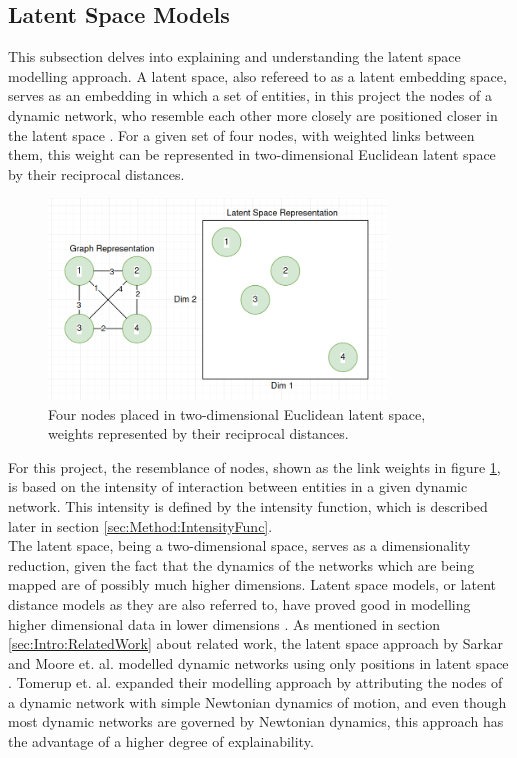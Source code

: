 \subsection{Latent Space Models}
\label{sec:Method:LSM}
This subsection delves into explaining and understanding the latent space modelling approach. A latent space, also refereed to as a latent embedding space, serves as an embedding in which a set of entities, in this project the nodes of a dynamic network, who resemble each other more closely are positioned closer in the latent space \cite{Sarkar2005DynamicModels} \cite{Kim2017AVariables}.
For a given set of four nodes, with weighted links between them, this weight can be represented in two-dimensional Euclidean latent space by their reciprocal distances.  

\begin{figure}[H]
    \centering
    \includegraphics[width=0.8\textwidth]{0_images/latentspace.png}
    \caption{Four nodes placed in two-dimensional Euclidean latent space, weights represented by their reciprocal distances.}
    \label{fig:latentspace}
\end{figure}
\noindent
For this project, the resemblance of nodes, shown as the link weights in figure \ref{fig:latentspace}, is based on the intensity of interaction between entities in a given dynamic network.
This intensity is defined by the intensity function, which is described later in section \ref{sec:Method:IntensityFunc}.
\\
The latent space, being a two-dimensional space, serves as a dimensionality reduction, given the fact that the dynamics of the networks which are being mapped are of possibly much higher dimensions.
Latent space models, or latent distance models as they are also referred to, have proved good in modelling higher dimensional data in lower dimensions \cite{Gourieroux2021ScalableNetworks}.
As mentioned in section \ref{sec:Intro:RelatedWork} about related work, the latent space approach by Sarkar and Moore et. al. modelled dynamic networks using only positions in latent space \cite{Sarkar2005DynamicModels}.
Tomerup et. al. \cite{Tommerup2021LearningNetworks} expanded their modelling approach by attributing the nodes of a dynamic network with simple Newtonian dynamics of motion, and even though most dynamic networks are governed by Newtonian dynamics, this approach has the advantage of a higher degree of explainability.

